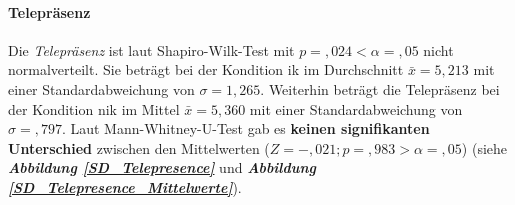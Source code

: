 \documentclass[a4paper,11pt]{article}%
\renewcommand{\\}{\vspace*{0.5\baselineskip} \newline}
\begin{document}
{\newpage

\paragraph{Telepräsenz} 
Die \textit{Telepräsenz} ist laut Shapiro-Wilk-Test mit $p =,024 < \alpha = ,05$ nicht normalverteilt. 
Sie beträgt bei der Kondition \ac{ik} im Durchschnitt $\bar{x} = 5,213$ mit einer Standardabweichung von $\sigma = 1,265$.
Weiterhin beträgt die Telepräsenz bei der Kondition \ac{nik} im Mittel $\bar{x} = 5,360$ mit einer Standardabweichung von $\sigma =,797$. 
Laut Mann-Whitney-U-Test gab es \textbf{keinen signifikanten Unterschied} zwischen den Mittelwerten ($ Z = -,021; p =,983 > \alpha = ,05$) (siehe \textbf{\textit{Abbildung \ref{SD_Telepresence}}} und \textbf{\textit{Abbildung \ref{SD_Telepresence_Mittelwerte}}}).

}
\end{document}
